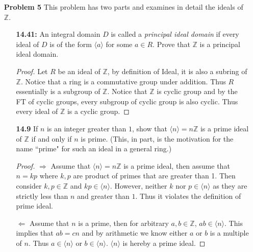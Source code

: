 \documentclass[11pt, oneside]{article}
\newcommand{\Z}{\mathbb Z}
\begin{document}
\begin{enumerate}
\begin{enumerate}
\begin{proof}
Let $I$ be an arbitrary ideal of $R$ that contains all of $a_1,...a_n$, then by the multiplicative property of ideal, we know that for arbitrary $r_1\in R$, $ar_1\in I$. 

In similar vein, for arbitrary $r_2...r_n\in R$, we have $r_2a_2, r_3a_3...r_na_n\in I$ as well. Since the addition is also closed in $I$, we have $r_1a_1+\cdots + r_na_n\in I$ for arbitrarily chosen $r_i\in R$. To write in set notation: 
\[\{r_1a_1+\cdots + r_na_n\,|\, r_i\in R\}\subseteq I\]
And we have found our desired results.
\end{proof}
\end{enumerate}


\newpage

\item[{\bf Problem 5}] This problem has two parts and examines in detail the ideals of $\Z$.
\begin{enumerate}
\item[{\bf 14.41:}]  An integral domain $D$ is called a {\it principal ideal domain} if every ideal of $D$ is of the form $\langle a \rangle$ for some $a\in R$. Prove that $\Z$ is a principal ideal domain. 
\begin{proof}
Let $R$ be an ideal of $\Z$, by definition of Ideal, it is also a subring of $\Z$. Notice that a ring is a commutative group under addition. Thus $R$ essentially is a subgroup of $\Z$. Notice that $\Z$ is cyclic group and by the FT of cyclic groups, every subgroup of cyclic group is also cyclic. Thus every ideal of $\Z$ is a cyclic group. 
\end{proof}

\item[{\bf 14.9}]  If $n$ is an integer greater than $1$, show that $\langle n \rangle  = n\Z$ is a prime ideal of $\Z$ if and only if $n$ is prime. (This, in part, is the motivation for the name ``prime" for such an ideal in a general ring.)
\begin{proof}
$\Rightarrow$ Assume that $\langle n \rangle  = n\Z$ is a prime ideal, then assume that $n=kp$ where $k,p$ are product of primes that are greater than 1. Then consider $k,p\in \Z$ and $kp\in \langle n \rangle$. However, neither $k$ nor $p\in \langle n \rangle$ as they are strictly less than $n$ and greater than $1$. Thus it violates the definition of prime ideal.

$\Leftarrow$ Assume that $n$ is a prime, then for arbitrary $a,b\in \Z$, $ab\in \langle n \rangle$. This implies that $ab=cn$ and by arithmetic we know either $a$ or $b$ is a multiple of $n$. Thus $a\in \langle n \rangle$ or $b\in \langle n \rangle$. $\langle n \rangle$ is hereby a prime ideal.
\end{proof}
\end{enumerate}


\end{enumerate}
\end{document}
